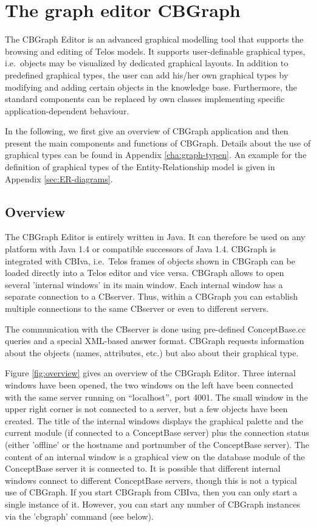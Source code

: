 \newpage
\section{The graph editor CBGraph}
\label{sec:graphed}

The CBGraph Editor is an advanced graphical modelling tool that
supports the browsing and editing of Telos models.
It supports user-definable graphical types, i.e.\
objects may be visualized by dedicated graphical layouts. In
addition to predefined graphical types, the user can add his/her own
graphical types by modifying and adding certain objects in the knowledge
base. Furthermore, the standard components can be replaced by own classes
implementing specific application-dependent behaviour.

In the following, we first give an overview of CBGraph application
and then present the main components and functions of CBGraph.
Details about the use of graphical types can be found in Appendix
\ref{cha:graph-typen}. An example for the definition of graphical types
of the Entity-Relationship model is given in Appendix \ref{sec:ER-diagrams}.

\subsection{Overview}

The CBGraph Editor is entirely written in Java. It can
therefore be used on any platform with Java 1.4 or compatible successors of Java 1.4.
CBGraph is integrated with CBIva, i.e.\ Telos frames
of objects shown in CBGraph can be loaded directly
into a Telos editor and vice versa. CBGraph allows to open
several 'internal windows' in its main window. Each internal window has a separate
connection to a CBserver. Thus, within a CBGraph
you can establish multiple connections to the same CBserver or even to
different servers.

The communication with the CBserver is done using pre-defined
ConceptBase.cc queries and a special XML-based answer format.
CBGraph requests information about the objects (names, attributes, etc.)
but also about their graphical type.


Figure \ref{fig:overview} gives an
overview of the CBGraph Editor. Three internal windows
have been opened, the two windows on the left have been connected
with the same server running on ``localhost'', port 4001. The small
window in the upper right corner is not connected to a server, but
a few objects have been created. The title of the internal windows 
displays the graphical palette and the current module (if connected
to a ConceptBase server) plus the connection status (either 'offline'
or the hostname and portnumber of the ConceptBase server). The content of
an internal window is a graphical view on the database module of the
ConceptBase server it is connected to. It is possible that different
internal windows connect to different ConceptBase servers, though this
is not a typical use of CBGraph. If you start CBGraph from CBIva, then
you can only start a single instance of it. However, you can start any
number of CBGraph instances via the 'cbgraph' command (see below).


